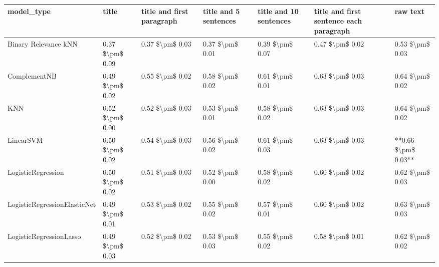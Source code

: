 \begin{tabular}{lllllll}
\toprule
                     model\_type &           title & title and first paragraph & title and 5 sentences & title and 10 sentences & title and first sentence each paragraph &            raw text \\
\midrule
           Binary Relevance kNN & 0.37 \$\textbackslash pm\$ 0.09 &           0.37 \$\textbackslash pm\$ 0.03 &       0.37 \$\textbackslash pm\$ 0.01 &        0.39 \$\textbackslash pm\$ 0.07 &                         0.47 \$\textbackslash pm\$ 0.02 &     0.53 \$\textbackslash pm\$ 0.03 \\
                   ComplementNB & 0.49 \$\textbackslash pm\$ 0.02 &           0.55 \$\textbackslash pm\$ 0.02 &       0.58 \$\textbackslash pm\$ 0.02 &        0.61 \$\textbackslash pm\$ 0.01 &                         0.63 \$\textbackslash pm\$ 0.03 &     0.64 \$\textbackslash pm\$ 0.02 \\
                            KNN & 0.52 \$\textbackslash pm\$ 0.00 &           0.52 \$\textbackslash pm\$ 0.03 &       0.53 \$\textbackslash pm\$ 0.01 &        0.58 \$\textbackslash pm\$ 0.02 &                         0.63 \$\textbackslash pm\$ 0.03 &     0.64 \$\textbackslash pm\$ 0.02 \\
                      LinearSVM & 0.50 \$\textbackslash pm\$ 0.02 &           0.54 \$\textbackslash pm\$ 0.03 &       0.56 \$\textbackslash pm\$ 0.02 &        0.61 \$\textbackslash pm\$ 0.03 &                         0.63 \$\textbackslash pm\$ 0.03 & **0.66 \$\textbackslash pm\$ 0.03** \\
             LogisticRegression & 0.50 \$\textbackslash pm\$ 0.02 &           0.51 \$\textbackslash pm\$ 0.03 &       0.52 \$\textbackslash pm\$ 0.00 &        0.58 \$\textbackslash pm\$ 0.02 &                         0.60 \$\textbackslash pm\$ 0.02 &     0.62 \$\textbackslash pm\$ 0.03 \\
   LogisticRegressionElasticNet & 0.49 \$\textbackslash pm\$ 0.01 &           0.53 \$\textbackslash pm\$ 0.02 &       0.55 \$\textbackslash pm\$ 0.02 &        0.57 \$\textbackslash pm\$ 0.01 &                         0.60 \$\textbackslash pm\$ 0.02 &     0.63 \$\textbackslash pm\$ 0.03 \\
        LogisticRegressionLasso & 0.49 \$\textbackslash pm\$ 0.03 &           0.52 \$\textbackslash pm\$ 0.02 &       0.53 \$\textbackslash pm\$ 0.03 &        0.55 \$\textbackslash pm\$ 0.02 &                         0.58 \$\textbackslash pm\$ 0.01 &     0.62 \$\textbackslash pm\$ 0.02 \\

\end{tabular}
